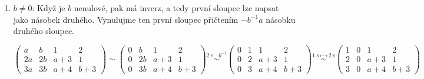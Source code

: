 \documentclass[12pt]{article}
\begin{document}
\begin{enumerate}
\begin{enumerate}
\begin{enumerate}
            \[
              \left( \begin{array}{cccc}
                1 & 0 & 0 & 0 \\
                0 & 0 & a+1 & 2 \\
                0 & 0 & 0 & b
              \end{array} \right)
              \sim
              \left( \begin{array}{cccc}
                1 & 0 & 0 & 0 \\
                0 & 0 & a+1 & 2 \\
                0 & 0 & 0 & 1
              \end{array} \right)
              \sim
              \left( \begin{array}{cccc}
                1 & 0 & 0 & 0 \\
                0 & 0 & a+1 & 0 \\
                0 & 0 & 0 & 1
              \end{array} \right)
              \sim
              \left( \begin{array}{cccc}
                1 & 0 & 0 & 0 \\
                0 & 0 & 1 & 0 \\
                0 & 0 & 0 & 1
              \end{array} \right)
            \]
        \end{enumerate}
      
      \item $b\neq0$: Když je $b$ nenulové, pak má inverz, a tedy první sloupec lze napsat jako násobek druhého.
        Vynulujme ten první sloupec přičtením $-b^{-1}a$ násobku druhého sloupce.

        \[
          \left( \begin{array}{cccc}
            a & b & 1 & 2 \\
            2a & 2b & a+3 & 1 \\
            3a & 3b & a+4 & b+3
          \end{array} \right)
          \sim
          \left( \begin{array}{cccc}
            0 & b & 1 & 2 \\
            0 & 2b & a+3 & 1 \\
            0 & 3b & a+4 & b+3
          \end{array} \right)
          \overset{\text{2.s } \cdot b^{-1}}{\sim}
          \left( \begin{array}{cccc}
            0 & 1 & 1 & 2 \\
            0 & 2 & a+3 & 1 \\
            0 & 3 & a+4 & b+3
          \end{array} \right)
          \overset{\text{1.s } \leftrightarrow \text{ 2.s}}{\sim}
          \left( \begin{array}{cccc}
            1 & 0 & 1 & 2 \\
            2 & 0 & a+3 & 1 \\
            3 & 0 & a+4 & b+3
          \end{array} \right)
        \]


\end{enumerate}
\end{enumerate}
\end{document}
